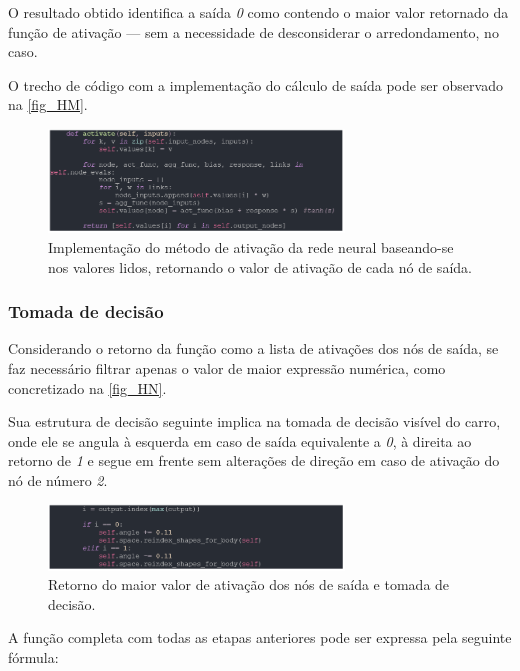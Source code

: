 O resultado obtido identifica a saída \textit{0} como contendo o maior valor retornado da função de ativação —
sem a necessidade de desconsiderar o arredondamento, no caso.

O trecho de código com a implementação do cálculo de saída pode ser observado na \autoref{fig_HM}.

\begin{figure}[htb]
        \centering
        \caption{\label{fig_HM}Implementação do método de ativação da rede neural baseando-se nos valores lidos, retornando o valor de ativação de cada nó de saída.}
        \includegraphics[width=0.7\textwidth]{images/HM.png}
\end{figure}

\subsubsection{Tomada de decisão}
Considerando o retorno da função como a lista de ativações dos nós de saída, se faz necessário filtrar
apenas o valor de maior expressão numérica, como concretizado na \autoref{fig_HN}.

Sua estrutura de decisão seguinte implica na tomada de decisão visível do carro, onde ele se angula
à esquerda em caso de saída equivalente a \textit{0}, à direita ao retorno de \textit{1} e segue em frente sem alterações
de direção em caso de ativação do nó de número \textit{2}.

\begin{figure}[htb]
        \centering
        \caption{\label{fig_HN}Retorno do maior valor de ativação dos nós de saída e tomada de decisão.}
        \includegraphics[width=0.7\textwidth]{images/HN.png}
\end{figure}

A função completa com todas as etapas anteriores pode ser expressa pela seguinte fórmula:

